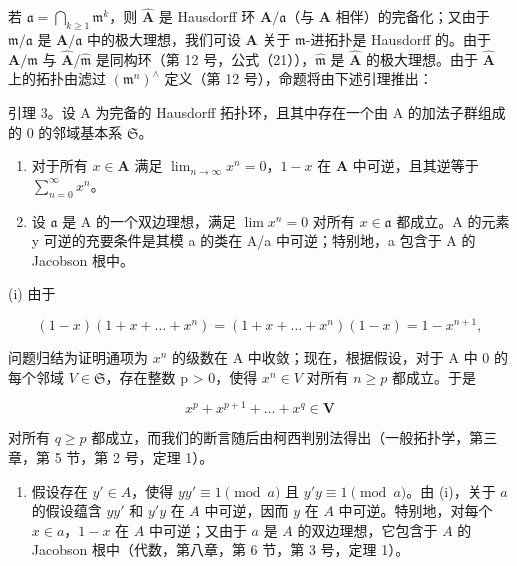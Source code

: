 若 \(\mathfrak{a} = \bigcap_{k\geqslant 1}\mathfrak{m}^k\)，则 \(\hat{\mathbf{A}}\) 是 Hausdorff 环 \(\mathbf{A} / \mathfrak{a}\)（与 \(\mathbf{A}\) 相伴）的完备化；又由于 \(\mathfrak{m} / \mathfrak{a}\) 是 \(\mathbf{A} / \mathfrak{a}\) 中的极大理想，我们可设 \(\mathbf{A}\) 关于 \(\mathfrak{m}\)-进拓扑是 Hausdorff 的。由于 \(\mathbf{A} / \mathfrak{m}\) 与 \(\hat{\mathbf{A}} /\hat{\mathfrak{m}}\) 是同构环（第 12 号，公式（21）），\(\hat{\mathfrak{m}}\) 是 \(\hat{\mathbf{A}}\) 的极大理想。由于 \(\hat{\mathbf{A}}\) 上的拓扑由滤过 \((\mathfrak{m}^n)^{\wedge}\) 定义（第 12 号），命题将由下述引理推出：

引理 3。设 A 为完备的 Hausdorff 拓扑环，且其中存在一个由 A 的加法子群组成的 0 的邻域基本系 \(\mathfrak{S}\)。

\begin{enumerate}
\def\labelenumi{(\roman{enumi})}
\item
  对于所有 \(x \in \mathbf{A}\) 满足 \(\lim_{n \to \infty} x^n = 0\)，\(1 - x\) 在 \(\mathbf{A}\) 中可逆，且其逆等于 \(\sum_{n=0}^{\infty} x^n\)。
\item
  设 \(\mathfrak{a}\) 是 A 的一个双边理想，满足 \(\lim x^n = 0\) 对所有 \(x \in \mathfrak{a}\) 都成立。A 的元素 y 可逆的充要条件是其模 a 的类在 A/a 中可逆；特别地，a 包含于 A 的 Jacobson 根中。
\end{enumerate}

(i) 由于

\[
(1 - x) (1 + x + \dots + x ^ {n}) = (1 + x + \dots + x ^ {n}) (1 - x) = 1 - x ^ {n + 1},
\]

问题归结为证明通项为 \(x^{n}\) 的级数在 A 中收敛；现在，根据假设，对于 A 中 0 的每个邻域 \(V \in \mathfrak{S}\)，存在整数 p \textgreater{} 0，使得 \(x^{n} \in V\) 对所有 \(n \geqslant p\) 都成立。于是

\[
x ^ {p} + x ^ {p + 1} + \dots + x ^ {q} \in \mathbf {V}
\]

对所有 \(q \geqslant p\) 都成立，而我们的断言随后由柯西判别法得出（一般拓扑学，第三章，第 5 节，第 2 号，定理 1）。

\begin{enumerate}
\def\labelenumi{(\roman{enumi})}
\setcounter{enumi}{1}
\tightlist
\item
  假设存在 \(y' \in A\)，使得 \(yy' \equiv 1 \pmod{a}\) 且 \(y'y \equiv 1 \pmod{a}\)。由 (i)，关于 \(a\) 的假设蕴含 \(yy'\) 和 \(y'y\) 在 \(A\) 中可逆，因而 \(y\) 在 \(A\) 中可逆。特别地，对每个 \(x \in a\)，\(1 - x\) 在 \(A\) 中可逆；又由于 \(a\) 是 \(A\) 的双边理想，它包含于 \(A\) 的 Jacobson 根中（代数，第八章，第 6 节，第 3 号，定理 1）。
\end{enumerate}

